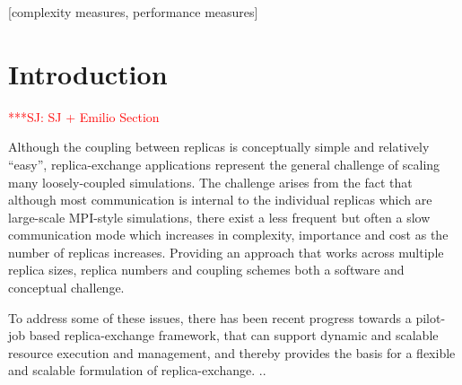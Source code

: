\documentclass{sig-alternate}
\newcommand{\jhanote}[1]{ {\textcolor{red} { ***SJ: #1 }}}
\newcommand{\jhanote}[1]{}
\begin{document}
\maketitle

\begin{abstract}

  A description of the computational workflow, viz., the different
  machines/resources used, how many ensembles we simulated, data
  volumnes managed etc., (ii) any computational performance issues
  including (a) measuring "efficiency" as the number of distributed
  resources utilized goes as measured by $T_c$ (time to completion),
  (b) $T_c$ as a function of the number of replicas, and (iii) a
  description of the software infrastructure that is employed to
  enable distributed replica-exchange on XSEDE.
  \jhanote{SJ}
\end{abstract}

[complexity measures, performance measures]



\section{Introduction}
\jhanote{SJ + Emilio Section}

Although the coupling between replicas is conceptually simple and
relatively ``easy'', replica-exchange applications represent the
general challenge of scaling many loosely-coupled simulations. The
challenge arises from the fact that although most communication is
internal to the individual replicas which are large-scale MPI-style
simulations, there exist a less frequent but often a slow
communication mode which increases in complexity, importance and cost
as the number of replicas increases. Providing an approach that works
across multiple replica sizes, replica numbers and coupling schemes
both a software and conceptual challenge.

To address some of these issues, there has been recent progress
towards a pilot-job based replica-exchange framework, that can support
dynamic and scalable resource execution and management, and thereby
provides the basis for a flexible and scalable formulation of
replica-exchange. ..
\end{document}
